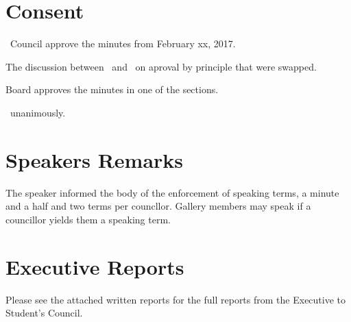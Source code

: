 \section*{Consent}

\begin{motion}
    \birt\ Council approve the minutes from February xx, 2017.
    \movers{\seneca}{\jennifer}

    The discussion between \seneca\ and \brian\ on aproval by principle that were 
    swapped.

    Board approves the minutes in one of the sections.

    \carries\ unanimously.
\end{motion}

\section*{Speakers Remarks}

The speaker informed the body of the enforcement of speaking terms, a minute
and a half and two terms per councllor. Gallery members may speak if a
councillor yields them a speaking term.

\section*{Executive Reports}

Please see the attached written reports for the full reports from the Executive
to Student's Council. 

